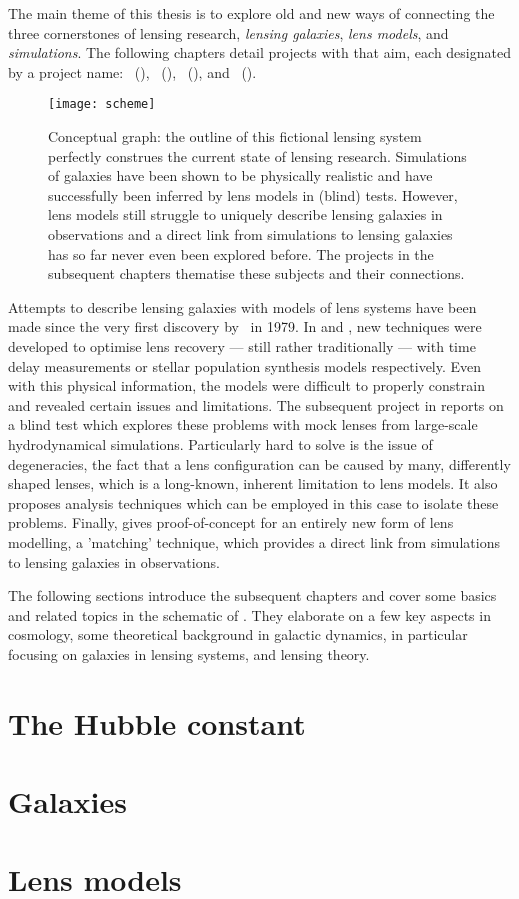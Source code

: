 The main theme of this thesis is to explore old and new ways of connecting the
three cornerstones of lensing research, \textit{lensing galaxies}, \textit{lens
models}, and \textit{simulations}. The following chapters detail projects with
that aim, each designated by a project name: ~(),
~(), ~(), and
~().

\begin{figure}[h]%
    \centering%
    \texttt{[image: scheme]}%
    \caption[Conceptual graph]{Conceptual graph: the outline of this fictional
        lensing system perfectly construes the current state of lensing
        research.  Simulations of galaxies have been shown to be physically
        realistic and have successfully been inferred by lens models in (blind)
        tests.  However, lens models still struggle to uniquely describe lensing
        galaxies in observations and a direct link from simulations to lensing
        galaxies has so far never even been explored before.  The projects in
        the subsequent chapters thematise these subjects and their connections.
        }%
\end{figure}%

Attempts to describe lensing galaxies with models of lens systems have been made
since the very first discovery by~ in 1979.  In
 and , new techniques were developed to optimise
lens recovery --- still rather traditionally --- with time delay measurements or
stellar population synthesis models respectively.  Even with this physical
information, the models were difficult to properly constrain and revealed
certain issues and limitations.  The subsequent project in  reports
on a blind test which explores these problems with mock lenses from large-scale
hydrodynamical simulations.  Particularly hard to solve is the issue of
degeneracies, the fact that a lens configuration can be caused by many,
differently shaped lenses, which is a long-known, inherent limitation to lens
models.  It also proposes analysis techniques which can be employed in this case
to isolate these problems.  Finally,  gives proof-of-concept for an
entirely new form of lens modelling, a 'matching' technique, which provides a
direct link from simulations to lensing galaxies in observations.

The following sections introduce the subsequent chapters and cover some basics
and related topics in the schematic of .  They elaborate on a
few key aspects in cosmology, some theoretical background in galactic dynamics,
in particular focusing on galaxies in lensing systems, and lensing theory.

\clearpage
\section{The Hubble constant}

\clearpage
\section{Galaxies}

\clearpage
\section{Lens models}

